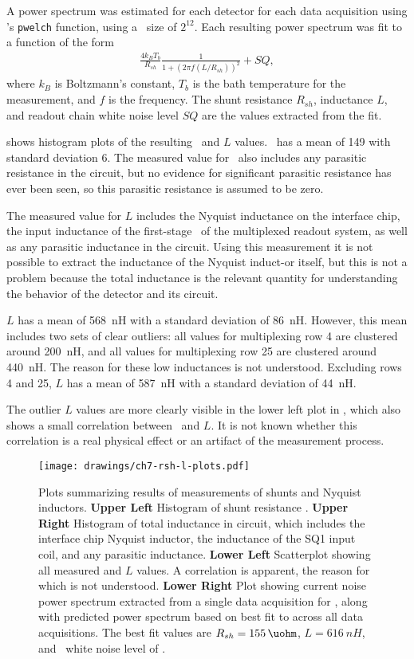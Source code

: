 A power spectrum was estimated for each detector for each data acquisition using \MATLAB's \texttt{pwelch} function, using a \FFT\ size of $2^{12}$.
Each resulting power spectrum was fit to a function of the form
\begin{eqnarray}\label{eqn:scnoise-fit}
	\frac{4 k_B T_b}{R_{sh}} \frac{1}{1 + (2 \pi f (L/R_{sh}))^2} + SQ,
\end{eqnarray}
where $k_B$ is Boltzmann's constant, $T_b$ is the bath temperature for the measurement, and $f$ is the frequency.
The shunt resistance $R_{sh}$, inductance $L$, and readout chain white noise level $SQ$ are the values extracted from the fit.

 shows histogram plots of the resulting \Rsh\ and $L$ values.
\Rsh\ has a mean of \SI{149}{\uohm} with standard deviation \SI{6}{\uohm}.
The measured value for \Rsh\ also includes any parasitic resistance in the circuit, but no evidence for significant parasitic resistance has ever been seen, so this parasitic resistance is assumed to be zero.

The measured value for $L$ includes the Nyquist inductance on the interface chip, the input inductance of the first-stage \SQUID\ of the multiplexed readout system, as well as any parasitic inductance in the circuit.
Using this measurement it is not possible to extract the inductance of the Nyquist induct-or itself, but this is not a problem because the total inductance is the relevant  quantity for understanding the behavior of the detector and its circuit.

$L$ has a mean of 568~nH with a standard deviation of 86~nH.
However, this mean includes two sets of clear outliers: all values for multiplexing row 4 are clustered around 200~nH, and all values for multiplexing row 25 are clustered around 440~nH.
The reason for these low inductances is not understood.
Excluding rows 4 and 25,  $L$ has a mean of 587~nH with a standard deviation of 44~nH.

The outlier $L$ values are more clearly visible in the lower left plot in , which also shows a small correlation between \Rsh\ and $L$.
It is not known whether this correlation is a real physical effect or an artifact of the measurement process.

\begin{figure*}
\texttt{[image: drawings/ch7-rsh-l-plots.pdf]}
\caption{Plots summarizing results of measurements of shunts and Nyquist inductors.
\textbf{Upper Left} Histogram of shunt resistance \Rsh.
\textbf{Upper Right} Histogram of total inductance in circuit, which includes the interface chip Nyquist inductor, the inductance of the SQ1 input coil, and any parasitic inductance.
\textbf{Lower Left} Scatterplot showing all measured \Rsh and $L$ values. A correlation is apparent, the reason for which is not understood.
\textbf{Lower Right} Plot showing current noise power spectrum extracted from a single data acquisition for , along with predicted power spectrum based on best fit to  across all data acquisitions. The best fit values are $\Rsh=\SI{155}{\uohm}$, $L = \SI{616}{nH}$, and \SQUID\ white noise level of .}
\label{fig:rsh-l-plots}
\end{figure*}

